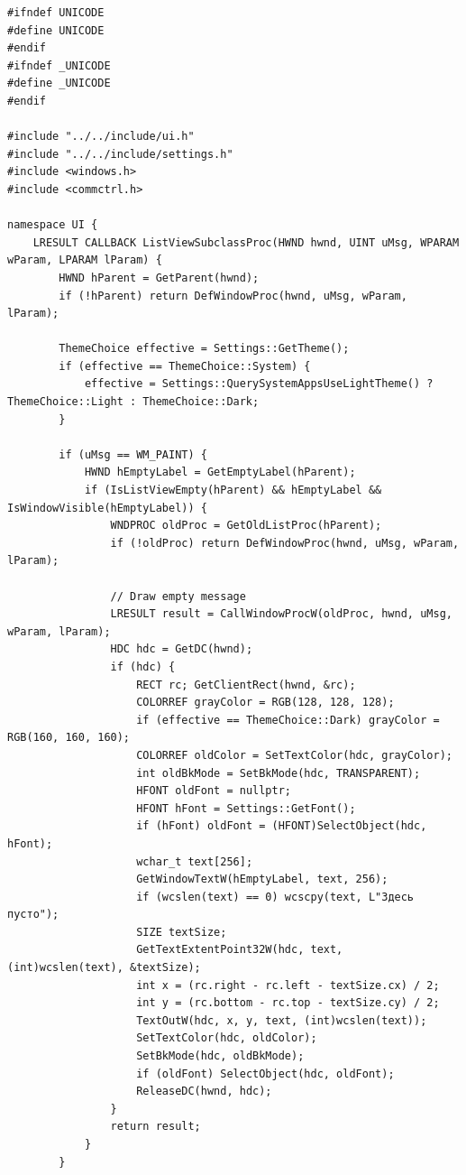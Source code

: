 \begin{lstlisting}[style=CodeListing]
#ifndef UNICODE
#define UNICODE
#endif
#ifndef _UNICODE
#define _UNICODE
#endif

#include "../../include/ui.h"
#include "../../include/settings.h"
#include <windows.h>
#include <commctrl.h>

namespace UI {
    LRESULT CALLBACK ListViewSubclassProc(HWND hwnd, UINT uMsg, WPARAM wParam, LPARAM lParam) {
        HWND hParent = GetParent(hwnd);
        if (!hParent) return DefWindowProc(hwnd, uMsg, wParam, lParam);
        
        ThemeChoice effective = Settings::GetTheme();
        if (effective == ThemeChoice::System) {
            effective = Settings::QuerySystemAppsUseLightTheme() ? ThemeChoice::Light : ThemeChoice::Dark;
        }
        
        if (uMsg == WM_PAINT) {
            HWND hEmptyLabel = GetEmptyLabel(hParent);
            if (IsListViewEmpty(hParent) && hEmptyLabel && IsWindowVisible(hEmptyLabel)) {
                WNDPROC oldProc = GetOldListProc(hParent);
                if (!oldProc) return DefWindowProc(hwnd, uMsg, wParam, lParam);
                
                // Draw empty message
                LRESULT result = CallWindowProcW(oldProc, hwnd, uMsg, wParam, lParam);
                HDC hdc = GetDC(hwnd);
                if (hdc) {
                    RECT rc; GetClientRect(hwnd, &rc);
                    COLORREF grayColor = RGB(128, 128, 128);
                    if (effective == ThemeChoice::Dark) grayColor = RGB(160, 160, 160);
                    COLORREF oldColor = SetTextColor(hdc, grayColor);
                    int oldBkMode = SetBkMode(hdc, TRANSPARENT);
                    HFONT oldFont = nullptr;
                    HFONT hFont = Settings::GetFont();
                    if (hFont) oldFont = (HFONT)SelectObject(hdc, hFont);
                    wchar_t text[256];
                    GetWindowTextW(hEmptyLabel, text, 256);
                    if (wcslen(text) == 0) wcscpy(text, L"Здесь пусто");
                    SIZE textSize;
                    GetTextExtentPoint32W(hdc, text, (int)wcslen(text), &textSize);
                    int x = (rc.right - rc.left - textSize.cx) / 2;
                    int y = (rc.bottom - rc.top - textSize.cy) / 2;
                    TextOutW(hdc, x, y, text, (int)wcslen(text));
                    SetTextColor(hdc, oldColor);
                    SetBkMode(hdc, oldBkMode);
                    if (oldFont) SelectObject(hdc, oldFont);
                    ReleaseDC(hwnd, hdc);
                }
                return result;
            }
        }
        

\end{lstlisting}
